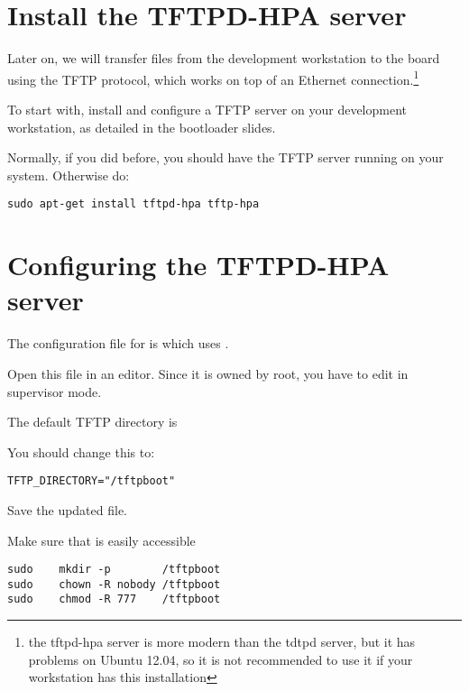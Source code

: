 

\section{Install the TFTPD-HPA server}

Later on, we will transfer files from the development workstation to
the board using the TFTP protocol, which works on top of an Ethernet
connection.\footnote{the tftpd-hpa server is more modern than the
tdtpd server, but it has problems on Ubuntu 12.04, 
so it is not recommended to use it if your workstation has this installation}

To start with, install and configure a TFTP server on your development
workstation, as detailed in the bootloader slides.

Normally, if you did  before, you should have
the TFTP server running on your system. Otherwise do:

\begin{verbatim}
sudo apt-get install tftpd-hpa tftp-hpa
\end{verbatim}

\section{Configuring the TFTPD-HPA server}

The configuration file for  is 
which uses .

Open this file in an editor. Since it is owned by root, you have to edit in supervisor mode.

The default TFTP directory is 

You should change this to:

\begin{verbatim}
TFTP_DIRECTORY="/tftpboot"
\end{verbatim}

Save the updated file.

Make sure that   is easily accessible

\begin{verbatim}
sudo    mkdir -p        /tftpboot
sudo    chown -R nobody /tftpboot
sudo    chmod -R 777    /tftpboot
\end{verbatim}

